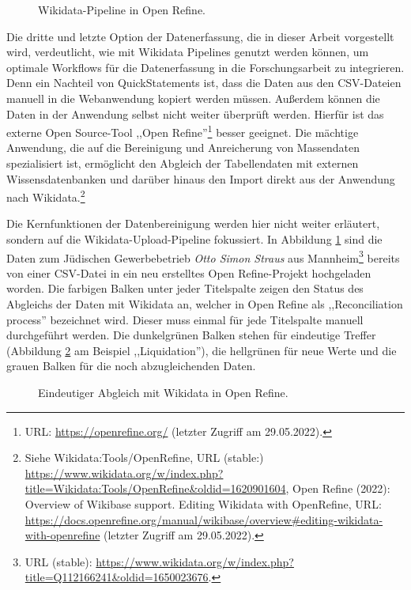 \begin{figure}[h]
    \centering
    \caption{Wikidata-Pipeline in Open Refine.}
    \label{fig:wikidatapipeline}
\end{figure}

Die dritte und letzte Option der Datenerfassung, die in dieser Arbeit vorgestellt wird, verdeutlicht, wie mit Wikidata Pipelines genutzt werden können, um optimale Workflows für die Datenerfassung in die Forschungsarbeit zu integrieren. Denn ein Nachteil von QuickStatements ist, dass die Daten aus den CSV-Dateien manuell in die Webanwendung kopiert werden müssen. Außerdem können die Daten in der Anwendung selbst nicht weiter überprüft werden. Hierfür ist das externe Open Source-Tool ,,Open Refine''\footnote{URL: \url{https://openrefine.org/} (letzter Zugriff am 29.05.2022).} besser geeignet. Die mächtige Anwendung, die auf die Bereinigung und Anreicherung von Massendaten spezialisiert ist, ermöglicht den Abgleich der Tabellendaten mit externen Wissensdatenbanken und darüber hinaus den Import direkt aus der Anwendung nach Wikidata.\footnote{Siehe Wikidata:Tools/OpenRefine, URL (stable:) \url{https://www.wikidata.org/w/index.php?title=Wikidata:Tools/OpenRefine\&oldid=1620901604}, Open Refine (2022): Overview of Wikibase support. Editing Wikidata with OpenRefine, URL: \url{https://docs.openrefine.org/manual/wikibase/overview\#editing-wikidata-with-openrefine} (letzter Zugriff am 29.05.2022).}

Die Kernfunktionen der Datenbereinigung werden hier nicht weiter erläutert, sondern auf die Wikidata-Upload-Pipeline fokussiert. In Abbildung \ref{fig:wikidatapipeline} sind die Daten zum Jüdischen Gewerbebetrieb \textit{Otto Simon Straus} aus Mannheim\footnote{URL (stable): \url{https://www.wikidata.org/w/index.php?title=Q112166241\&oldid=1650023676}.} bereits von einer CSV-Datei in ein neu erstelltes Open Refine-Projekt hochgeladen worden. Die farbigen Balken unter jeder Titelspalte zeigen den Status des Abgleichs der Daten mit Wikidata an, welcher in Open Refine als ,,Reconciliation process'' bezeichnet wird. Dieser muss einmal für jede Titelspalte manuell durchgeführt werden. Die dunkelgrünen Balken stehen für eindeutige Treffer (Abbildung \ref{fig:wikidatareconciliation} am Beispiel ,,Liquidation''), die hellgrünen für neue Werte und die grauen Balken für die noch abzugleichenden Daten. 

\begin{figure}[h]
    \centering
    \caption{Eindeutiger Abgleich mit Wikidata in Open Refine.}
    \label{fig:wikidatareconciliation}
\end{figure}

